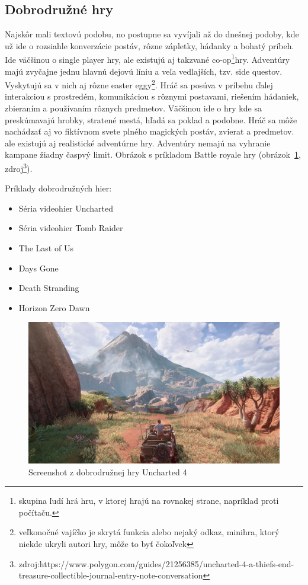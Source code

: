 \documentclass[10pt,oneside,slovak,a4paper]{article}
\begin{document}
\subsection{Dobrodružné hry} \label{zanre:adventure}

Najskôr mali textovú podobu, no postupne sa vyvíjali až do dnešnej podoby, kde už ide o rozsiahle konverzácie postáv, rôzne zápletky, hádanky a bohatý príbeh. Ide väčšinou o single player hry, ale existujú aj takzvané co-op\footnote{skupina ľudí hrá hru, v ktorej hrajú na rovnakej strane, napríklad proti počítaču.}hry. Adventúry majú zvyčajne jednu hlavnú dejovú líniu a veľa vedlajších, tzv. side questov. Vyskytujú sa v nich aj rôzne easter eggy\footnote{veľkonočné vajíčko je skrytá funkcia alebo nejaký odkaz, minihra, ktorý niekde ukryli autori hry, môže to byť čokoľvek }. Hráč sa posúva v príbehu ďalej interakciou s prostredém, komunikáciou s rôznymi postavami, riešením hádaniek, zbieraním a používaním rôznych predmetov. Väčšinou ide o hry kde sa preskúmavajú hrobky, stratené mestá, hľadá sa poklad a podobne. Hráč sa môže nachádzať aj vo fiktívnom svete plného magických postáv, zvierat a predmetov. ale existujú aj realistické adventúrne hry. Adventúry nemajú na vyhranie kampane žiadny časpvý limit. Obrázok s príkladom Battle royale hry (obrázok~\ref{f:uncharted}, zdroj\footnote{zdroj:https://www.polygon.com/guides/21256385/uncharted-4-a-thiefs-end-treasure-collectible-journal-entry-note-conversation}).

Príklady dobrodružných hier:
\begin{itemize}
\item Séria videohier Uncharted
\item Séria videohier Tomb Raider
\item The Last of Us
\item Days Gone
\item Death Stranding
\item Horizon Zero Dawn
\end{itemize}

\begin{figure}[tbh]
\centering
\includegraphics[scale=0.2]{Screenshot.jpg}
\caption{Screenshot z dobrodružnej hry Uncharted 4}
\label{f:uncharted}
\end{figure}
\end{document}
